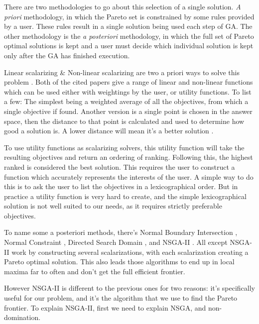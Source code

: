 \documentclass[11pt]{article}
\begin{document}
    There are two methodologies to go about this selection of a single solution. \textit{A priori}
    methodology, in which the Pareto set is constrained by some rules provided by a user.
    These rules result in a single solution being used each step of GA. The other
    methodology is the \textit{a posteriori} methodology, in which
    the full set of Pareto optimal solutions is kept and a user must decide which individual
    solution is kept only after the GA has finished execution.

    Linear scalarizing \& Non-linear scalarizing are two a priori ways to solve this problem
    \cite{KaisaMarko, Moffaert}. Both of the cited papers give a range of linear and non-linear
    functions which can be used either with weightings by the user, or utility functions.
    To list a few: The simplest being a weighted average of all the objectives, from
    which a single objective if found. Another version is a single point is chosen
    in the answer space, then the distance to that point is calculated and used to
    determine how good a solution is. A lower distance will mean it's a better solution
    \cite{Buchanan}.

    To use utility functions as scalarizing solvers, this utility function will take
    the resulting objectives and return an ordering of ranking. Following this, the highest
    ranked is considered the best solution. This requires the user to construct
    a function which accurately represents the interests of the user. A simple way
    to do this is to ask the user to list the objectives in a lexicographical order.
    But in practice a utility function is very hard to create, and the simple
    lexicographical solution is not well suited to our needs, as it requires
    strictly preferable objectives.

    To name some a posteriori methods, there's Normal Boundary Intersection \cite{Indraneel},
    Normal Constraint \cite{Messac}, Directed Search Domain \cite{Tohid}, and NSGA-II
    \cite{DebPratapAgarwalMeyarivan}. All except NSGA-II work by constructing several
    scalarizations, with each scalarization creating a Pareto optimal solution.
    This also leads those algorithms to end up in local maxima far to often and
    don't get the full efficient frontier.

    However NSGA-II is different to the previous ones for two reasons: it's specifically useful for our
    problem, and it's the algorithm that
    we use to find the Pareto frontier. To explain NSGA-II, first we need to explain
    NSGA, and non-domination.
\end{document}
